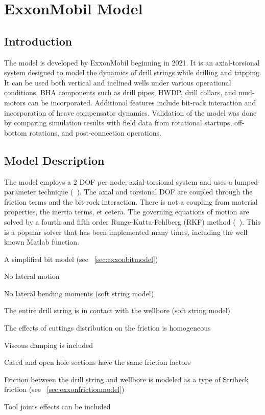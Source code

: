 \chapter{ExxonMobil Model}
\label{ch:exxonmobilmodel}

\section{Introduction}
The model is developed by ExxonMobil beginning in 2021.  It is an axial-torsional system designed to model the dynamics of drill strings while drilling and tripping. It can be used both vertical and inclined wells under various operational conditions.  BHA components such as drill pipes, HWDP, drill collars, and mud-motors can be incorporated.  Additional features include bit-rock interaction and incorporation of heave compensator dynamics. Validation of the model was done by comparing simulation results with field data from rotational startups, off-bottom rotations, and post-connection operations.

\section{Model Description}
The model employs a 2 DOF per node, axial-torsional system and uses a lumped-parameter technique (~\cite{ref:dixit2021a}). The axial and torsional DOF are coupled through the friction terms and the bit-rock interaction.  There is not a coupling from material properties, the inertia terms, et cetera.  The governing equations of motion are solved by a fourth and fifth order Runge-Kutta-Fehlberg (RKF) method (~\cite{ref:shor2022a}).  This is a popular solver that has been implemented many times, including the well known Matlab  function.

\begin{bulletedlist}
	\item A simplified bit model (see \sectionname~\ref{sec:exxonbitmodel})
	\item No lateral motion
    \item No lateral bending moments (soft string model)
    \item The entire drill string is in contact with the wellbore (soft string model)
	\item The effects of cuttings distribution on the friction is homogeneous
	\item Viscous damping is included
	\item Cased and open hole sections have the same friction factors
    \item Friction between the drill string and wellbore is modeled as a type of Stribeck friction (see \sectionname~\ref{sec:exxonfrictionmodel})
    \item Tool joints effects can be included
\end{bulletedlist}


